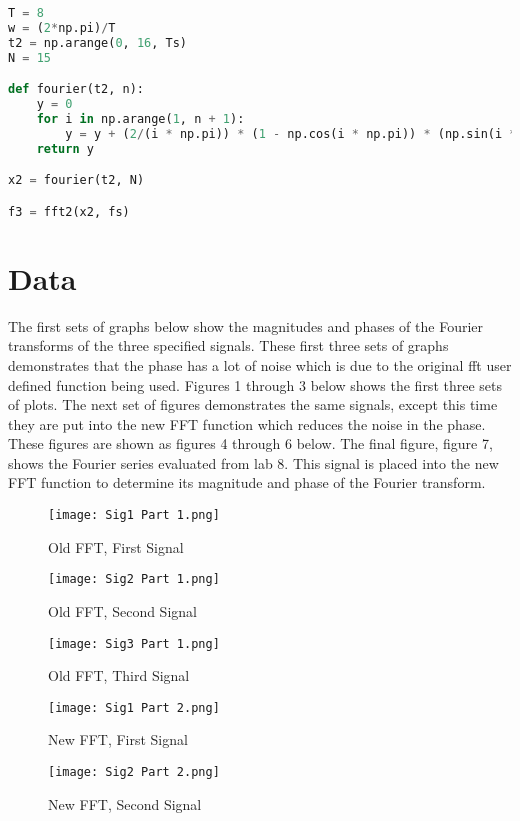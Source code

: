 \documentclass[12pt]{report}
\begin{document}
\begin{lstlisting}[language=Python, caption=Task 5 code]
T = 8
w = (2*np.pi)/T
t2 = np.arange(0, 16, Ts)
N = 15

def fourier(t2, n):
    y = 0
    for i in np.arange(1, n + 1):
        y = y + (2/(i * np.pi)) * (1 - np.cos(i * np.pi)) * (np.sin(i * w * t2))       
    return y

x2 = fourier(t2, N)

f3 = fft2(x2, fs)
\end{lstlisting}

\section{Data}
\hspace{\parindent}The first sets of graphs below show the magnitudes and phases of the Fourier transforms of the three specified signals. These first three sets of graphs demonstrates that the phase has a lot of noise which is due to the original fft user defined function being used. Figures 1 through 3 below shows the first three sets of plots. The next set of figures demonstrates the same signals, except this time they are put into the new FFT function which reduces the noise in the phase. These figures are shown as figures 4 through 6 below. The final figure, figure 7, shows the Fourier series evaluated from lab 8. This signal is placed into the new FFT function to determine its magnitude and phase of the Fourier transform.
\begin{figure}[h!]
    \centering
    \texttt{[image: Sig1 Part 1.png]}
    \caption{Old FFT, First Signal}
    \label{Figure x:}
\end{figure}
\begin{figure}[h!]
    \centering
    \texttt{[image: Sig2 Part 1.png]}
    \caption{Old FFT, Second Signal}
    \label{Figure x:}
\end{figure}
\begin{figure}[h!]
    \centering
    \texttt{[image: Sig3 Part 1.png]}
    \caption{Old FFT, Third Signal}
    \label{Figure x:}
\end{figure}
\begin{figure}[h!]
    \centering
    \texttt{[image: Sig1 Part 2.png]}
    \caption{New FFT, First Signal}
    \label{Figure x:}
\end{figure}
\begin{figure}[h!]
    \centering
    \texttt{[image: Sig2 Part 2.png]}
    \caption{New FFT, Second Signal}
    \label{Figure x:}
\end{figure}
\end{document}
